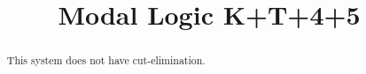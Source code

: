 \documentclass[a4]{article}
\title{Modal Logic K+T+4+5}
\begin{document}
\maketitle

\begin{abstract}
This system does not have cut-elimination.
\end{abstract}


\tableofcontents



\newpage

\newpage

\newpage

\newpage

\newpage

\end{document}
